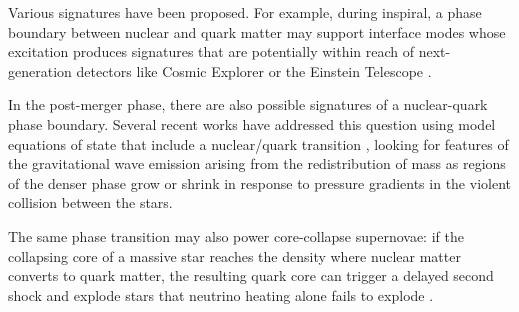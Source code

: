 \documentclass[10pt,superscriptaddress,
amsmath,aps,prc,twocolumn,nofootinbib,floatfix]{revtex4-1}
\newcommand{\AHcom}[1]{\textsf{\color{cyan}{\textsuperscript{AH}#1}}}
\newcommand{\m}{\text{m}}
\newcommand{\s}{\text{s}}
\begin{document}
Various signatures have been proposed. For example, during inspiral, a phase boundary between nuclear and quark matter may support interface modes whose excitation produces signatures that are potentially within reach of next-generation detectors like Cosmic Explorer or the Einstein Telescope \cite{Counsell:2025hcv,Pereira:2025xsi}. %

In the post-merger phase, there are also possible signatures of
a nuclear-quark phase boundary.
Several recent works have addressed this question using model equations of state that include a nuclear/quark transition \cite{Most:2018eaw,Bauswein:2018bma,Espino:2023llj,Weih:2019xvw,Harada:2023eyg,Bauswein:2020ggy,Haque:2022dsc,Fujimoto:2022xhv,Christian:2023hez,Fujimoto:2024ymt},
looking for features of the gravitational wave emission arising from the redistribution of mass
as regions of the denser phase grow or shrink in response to pressure gradients in the violent collision between the stars. %

The same phase transition may also power core-collapse supernovae: if the collapsing core of a massive star reaches the density where nuclear matter converts to quark matter, the resulting quark core can trigger a delayed second shock and explode stars that neutrino heating alone fails to explode \cite{Fischer:2010wp,Fischer:2017lag,Fischer:2021tvv}.
\end{document}
